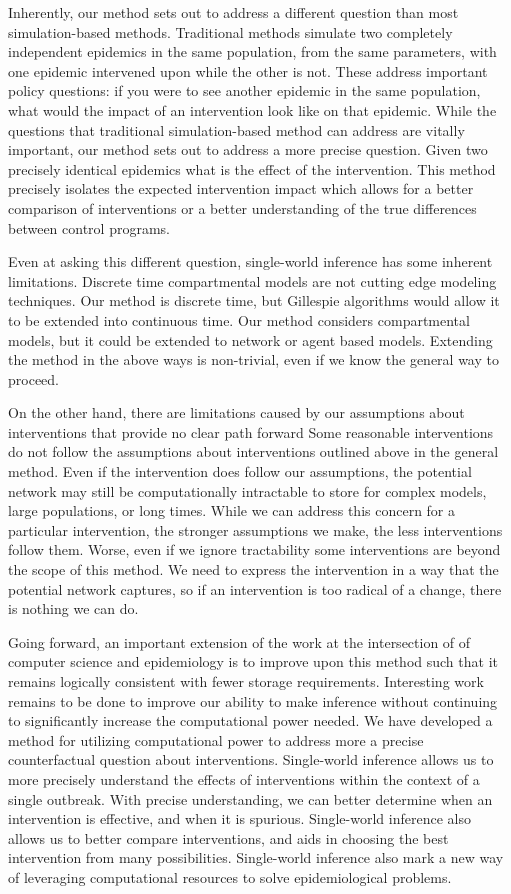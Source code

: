 \documentclass[PTRSB]{rsos}
\begin{document}
\begin{multicols}{2}
Inherently, our method sets out to address a different question than most simulation-based methods. 
Traditional methods simulate two completely independent epidemics in the same population, from the same parameters, with one epidemic intervened upon while the other is not. 
These address important policy questions: if you were to see another epidemic in the same population, what would the impact of an intervention look like on that epidemic. 
While the questions that traditional simulation-based method can address are vitally important, our method sets out to address a more precise question. 
Given two precisely identical epidemics what is the effect of the intervention. 
This method precisely isolates the expected intervention impact which allows for a better comparison of interventions or a better understanding of the true differences between control programs.

Even at asking this different question, single-world inference has some inherent limitations.
Discrete time compartmental models are not cutting edge modeling techniques.
Our method is discrete time, but Gillespie algorithms would allow it to be extended into continuous time.
Our method considers compartmental models, but it could be extended to network or agent based models.
Extending the method in the above ways is non-trivial, even if we know the general way to proceed.

On the other hand, there are limitations caused by our assumptions about interventions that provide no clear path forward
Some reasonable interventions do not follow the assumptions about interventions outlined above in the general method.
Even if the intervention does follow our assumptions, the potential network may still be computationally intractable to store for complex models, large populations, or long times.
While we can address this concern for a particular intervention, the stronger assumptions we make, the less interventions follow them.
Worse, even if we ignore tractability some interventions are beyond the scope of this method.
We need to express the intervention in a way that the potential network captures, so if an intervention is too radical of a change, there is nothing we can do.

Going forward, an important extension of the work at the intersection of of computer science and epidemiology is to improve upon this method such that it remains logically consistent with fewer storage requirements. 
Interesting work remains to be done to improve our ability to make inference without continuing to significantly increase the computational power needed.
We have developed a method for utilizing computational power to address more a precise counterfactual question about interventions. 
Single-world inference allows us to more precisely understand the effects of interventions within the context of a single outbreak. 
With precise understanding, we can better determine when an intervention is effective, and when it is spurious.
Single-world inference also allows us to better compare interventions, and aids in choosing the best intervention from many possibilities. 
Single-world inference also mark a new way of leveraging computational resources to solve epidemiological problems.


\end{multicols}
\end{document}
